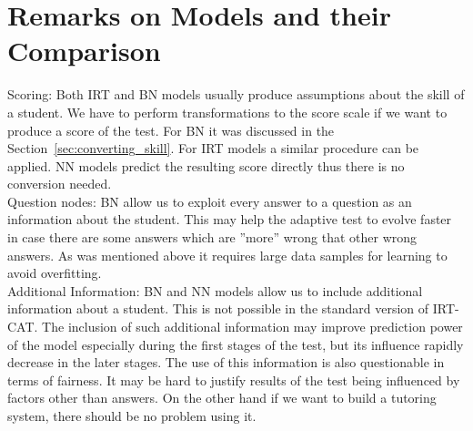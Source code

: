 \section{Remarks on Models and their Comparison}
Scoring: Both IRT and BN models usually produce assumptions about the skill of a student. We have to perform transformations to the score scale if we want to produce a score of the test. For BN it was discussed in the Section~\ref{sec:converting_skill}. For IRT models a similar procedure can be applied. NN models predict the resulting score directly thus there is no conversion needed.\\
Question nodes: BN allow us to exploit every answer to a question as an information about the student. This may help the adaptive test to evolve faster in case there are some answers which are ''more'' wrong that other wrong answers. As was mentioned above it requires large data samples for learning to avoid overfitting.\\
Additional Information: BN and NN models allow us to include additional information about a student. This is not possible in the standard version of IRT-CAT. The inclusion of such additional information may improve prediction power of the model especially during the first stages of the test, but its influence rapidly decrease in the later stages. The use of this information is also questionable in terms of fairness. It may be hard to justify results of the test being influenced by factors other than answers. On the other hand if we want to build a tutoring system, there should be no problem using it.

